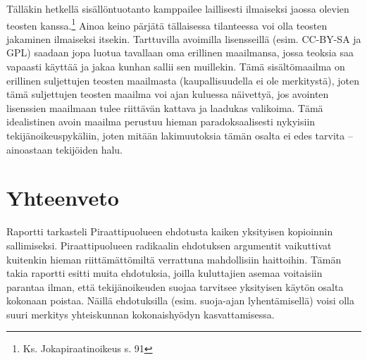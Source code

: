 \documentclass[titlepage,12pt]{article}
\begin{document}
Tälläkin hetkellä sisällöntuotanto kamppailee laillisesti ilmaiseksi
jaossa olevien teosten kanssa.\footnote{Ks. Jokapiraatinoikeus s. 91}
Ainoa keino pärjätä tällaisessa tilanteessa voi olla teosten jakaminen
ilmaiseksi itsekin.  Tarttuvilla avoimilla lisensseillä
(esim. CC-BY-SA ja GPL) saadaan jopa luotua tavallaan oma erillinen
maailmansa, jossa teoksia saa vapaasti käyttää ja jakaa kunhan sallii
sen muillekin.  Tämä sisältömaailma on erillinen suljettujen teosten
maailmasta (kaupallisuudella ei ole merkitystä), joten tämä
suljettujen teosten maailma voi ajan kuluessa näivettyä, jos avointen
lisenssien maailmaan tulee riittävän kattava ja laadukas valikoima.
Tämä idealistinen avoin maailma perustuu hieman paradoksaalisesti
nykyisiin tekijänoikeuspykäliin, joten mitään lakimuutoksia tämän
osalta ei edes tarvita -- ainoastaan tekijöiden halu.





\section{Yhteenveto}

Raportti tarkasteli Piraattipuolueen ehdotusta kaiken yksityisen
kopioinnin sallimiseksi.  Piraattipuolueen radikaalin ehdotuksen
argumentit vaikuttivat kuitenkin hieman riittämättömiltä verrattuna
mahdollisiin haittoihin.  Tämän takia raportti esitti muita
ehdotuksia, joilla kuluttajien asemaa voitaisiin parantaa ilman, että
tekijänoikeuden suojaa tarvitsee yksityisen käytön osalta kokonaan
poistaa.  Näillä ehdotuksilla (esim. suoja-ajan lyhentämisellä) voisi
olla suuri merkitys yhteiskunnan kokonaishyödyn kasvattamisessa.



\pagebreak


  

    
\end{document}
